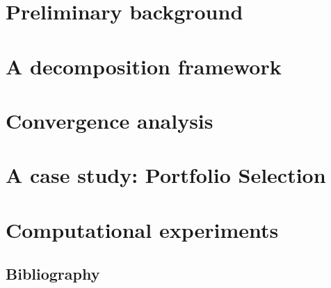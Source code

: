 \documentclass[preprint,12pt]{elsarticle}
\begin{document}
\section{Preliminary background}\label{sect:2}

\clearpage
\section{A decomposition framework}

\clearpage
\section{Convergence analysis}

\clearpage
\section{A case study: Portfolio Selection}

\clearpage
\section{Computational experiments}

\clearpage




\begin{thebibliography}{00}
\section{Bibliography}


\end{thebibliography}
\end{document}
